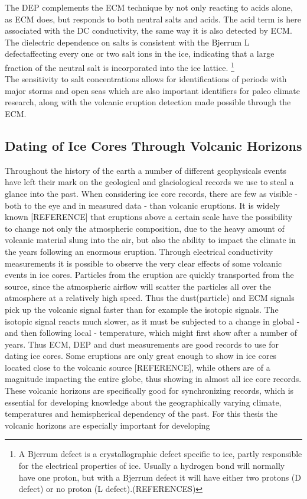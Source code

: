 \documentclass[../../CompleteThesis2/Complete_2ndDraft]{subfiles}
\begin{document}
The DEP complements the ECM technique by not only reacting to acids alone, as ECM does, but responds to both neutral salts and acids.
The acid term is here associated with the DC conductivity, the same way it is also detected by ECM. The dielectric dependence on salts is consistent with the Bjerrum L defect\footnotemark affecting every one or two salt ions in the ice, indicating that a large fraction of the neutral salt is incorporated into the ice lattice.
\footnote[3]{A Bjerrum defect is a crystallographic defect specific to ice, partly responsible for the electrical properties of ice. Usually a hydrogen bond will normally have one proton, but with a Bjerrum defect it will have either two protons (D defect) or no proton (L defect).(REFERENCES)}\\
The sensitivity to salt concentrations allows for identifications of periods with major storms and open seas which are also important identifiers for paleo climate research, along with the volcanic eruption detection made possible through the ECM.



\subsection[Volcanic Horizons][Volcanic Horizons]{Dating of Ice Cores Through Volcanic Horizons}
\label{Subsec:Ice_ECMandDEP_VolcanicHorizons}
Throughout the history of the earth a number of different geophysicals events have left their mark on the geological and glaciological records we use to steal a glance into the past. When considering ice core records, there are few as visible - both to the eye and in measured data - than volcanic eruptions. It is widely known [REFERENCE] that eruptions above a certain scale have the possibility to change not only the atmospheric composition, due to the heavy amount of volcanic material slung into the air, but also the ability to impact the climate in the years following an enormous eruption. 
Through electrical conductivity measurements it is possible to observe the very clear effects of some volcanic events in ice cores. Particles from the eruption are quickly transported from the source, since the atmospheric airflow will scatter the particles all over the atmosphere at a relatively high speed. Thus the dust(particle) and ECM signals pick up the volcanic signal faster than for example the isotopic signals. The isotopic signal reacts much slower, as it must be subjected to a change in global - and then following local - temperature, which might first show after a number of years. Thus ECM, DEP and dust measurements are good records to use for dating ice cores. Some eruptions are only great enough to show in ice cores located close to the volcanic source [REFERENCE], while others are of a magnitude impacting the entire globe, thus showing in almost all ice core records. These volcanic horizons are specifically good for synchronizing records, which is essential for developing knowledge about the geographically varying climate, temperatures and hemispherical dependency of the past. 
For this thesis the volcanic horizons are especially important for developing
\end{document}

